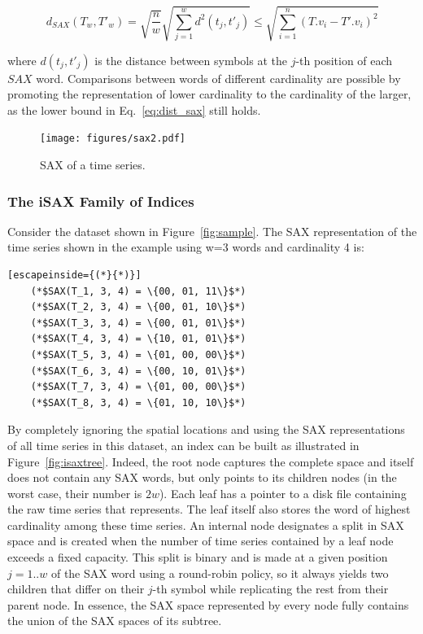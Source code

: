\begin{equation} \label{eq:dist_sax}
d_{SAX}(T_w, T'_w) =\sqrt{\frac{n}{w}} \sqrt{\sum_{j=1}^{w} d^2 (t_j, t'_j) }  \leq {\sqrt{\displaystyle \sum_{i=1}^{n}(T.v_i - T'.v_i)^2}}
\end{equation}

\noindent where $d(t_j, t'_j)$ is the distance between symbols at the $j$-th position of each $SAX$ word. Comparisons between \isax words of different cardinality are possible by promoting the \isax representation of lower cardinality to the cardinality of the larger, as the lower bound in Eq.~\ref{eq:dist_sax} still holds.

\begin{figure}[t]
	\centering
	\texttt{[image: figures/sax2.pdf]}
	\caption{SAX of a time series.}
	\label{fig:isax_representation}
\end{figure}

\subsubsection{The iSAX Family of Indices}
\label{subsec:isax}

Consider the dataset shown in Figure~\ref{fig:sample}. The SAX representation of the time series shown in the example using w=3 words and cardinality 4 is:

\begin{lstlisting}[escapeinside={(*}{*)}]
  	(*$SAX(T_1, 3, 4) = \{00, 01, 11\}$*)
	(*$SAX(T_2, 3, 4) = \{00, 01, 10\}$*)
	(*$SAX(T_3, 3, 4) = \{00, 01, 01\}$*)
	(*$SAX(T_4, 3, 4) = \{10, 01, 01\}$*)
	(*$SAX(T_5, 3, 4) = \{01, 00, 00\}$*)
	(*$SAX(T_6, 3, 4) = \{00, 10, 01\}$*)
	(*$SAX(T_7, 3, 4) = \{01, 00, 00\}$*)
	(*$SAX(T_8, 3, 4) = \{01, 10, 10\}$*)
\end{lstlisting}

By completely ignoring the spatial locations and using the SAX representations of all time series in this dataset, an \isax index \cite{shieh2008kdd} can be built as illustrated in Figure~\ref{fig:isaxtree}. Indeed, the root node captures the complete \isax space and itself does not contain any SAX words, but only points to its children nodes (in the worst case, their number is $2w$). Each leaf has a pointer to a disk file containing the raw time series that represents. The leaf itself also stores the \isax word of highest cardinality among these time series. An internal node designates a split in SAX space and is created when the number of time series contained by a leaf node exceeds a fixed capacity. This split is binary and is made at a given position $j=1..w$ of the SAX word using a round-robin policy, so it always yields two children that differ on their $j$-th symbol while replicating the rest from their parent node. In essence, the SAX space represented by every node fully contains the union of the SAX spaces of its subtree.

